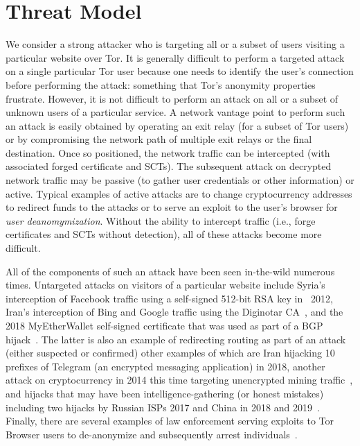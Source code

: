 \section{Threat Model} \label{sec:adversary}

We consider a strong attacker who is targeting all or a subset of users visiting
a particular website over Tor. It is generally difficult to perform a targeted
attack on a single particular Tor user because one needs to identify the user's
connection before performing the attack:
	something that Tor's anonymity properties frustrate.
However, it is not difficult to perform an attack on all or a subset of unknown
users of a particular service. A network vantage point to perform such an attack
is easily obtained by operating an exit relay (for a subset of Tor users) or by
compromising the network path of multiple exit relays or the final destination.
Once so positioned, the network traffic can be intercepted (with associated
forged certificate and SCTs). The subsequent attack on decrypted network traffic
may be passive (to gather user credentials or other information) or active.
Typical examples of active attacks are to change cryptocurrency addresses to
redirect funds to the attacks or to serve an exploit to the user's browser for
\emph{user deanomymization}. Without the ability to intercept traffic (i.e.,
forge certificates and SCTs without detection), all of these attacks become more
difficult.

All of the components of such an attack have been seen in-the-wild numerous
times. Untargeted attacks on visitors of a particular website include Syria's
interception of Facebook traffic using a self-signed 512-bit RSA key in ~2012,
Iran's interception of Bing and Google traffic using the Diginotar
CA~\cite{diginotar}, and the 2018 MyEtherWallet self-signed certificate that was
used as part of a BGP hijack~\cite{myetherwallet}.  The latter is also an
example of redirecting routing as part of an attack (either suspected or
confirmed) other examples of which are Iran hijacking 10 prefixes of Telegram
(an encrypted messaging application) in 2018, another attack on cryptocurrency
in 2014 this time targeting unencrypted mining
traffic~\cite{bgp-hijacking-for-crypto,bgp-hijacking-for-crypto-2}, and hijacks
that may have been intelligence-gathering (or honest mistakes) including two
hijacks by Russian ISPs 2017 and China in 2018 and 2019~\cite{wiki-bgp}.
Finally, there are several examples of law enforcement serving exploits to Tor
Browser users to de-anonymize and subsequently arrest
individuals~\cite{de-anonymize-exploit}.

